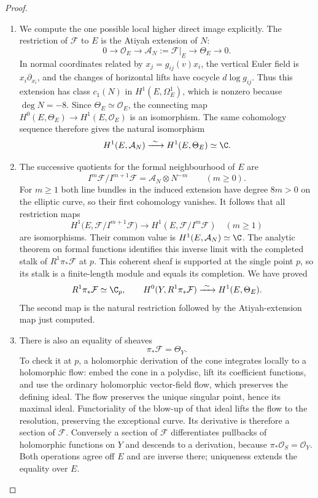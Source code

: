 \begin{proof}
\begin{enumerate}[label=\arabic*.,leftmargin=*]
\item We compute the one possible local higher direct image explicitly.
The restriction of $\mathcal F$ to $E$ is the Atiyah extension
of $N$:
\[
 0\longrightarrow\mathcal O_E
 \longrightarrow\mathcal A_N:=\mathcal F|_E
 \longrightarrow\Theta_E\longrightarrow0.
\]
In normal coordinates related by $x_j=g_{ij}(v)x_i$, the
vertical Euler field is $x_i\partial_{x_i}$, and the changes of
horizontal lifts have cocycle $d\log g_{ij}$.
Thus this extension has class $c_1(N)$ in
$H^1(E,\Omega^1_E)$, which is nonzero because $\deg N=-8$.
Since $\Theta_E\simeq\mathcal O_E$, the connecting map
$H^0(E,\Theta_E)\to H^1(E,\mathcal O_E)$ is an isomorphism.
The same cohomology sequence therefore gives the natural
isomorphism
\[
 H^1(E,\mathcal A_N)\xrightarrow{\ \sim\ }
 H^1(E,\Theta_E)\simeq\C.
\]

\item The successive quotients for the formal neighbourhood of $E$ are
\[
 I^m\mathcal F/I^{m+1}\mathcal F
     =\mathcal A_N\otimes N^{-m}\qquad(m\ge0).
\]
For $m\ge1$ both line bundles in the induced extension have
degree $8m>0$ on the elliptic curve, so their first cohomology
vanishes.  It follows that all restriction maps
\[
 H^1\bigl(E,\mathcal F/I^{m+1}\mathcal F\bigr)
 \longrightarrow H^1(E,\mathcal F/I^m\mathcal F)
 \quad(m\ge1)
\]
are isomorphisms.  Their common value is
$H^1(E,\mathcal A_N)\simeq\C$.
The analytic theorem on formal functions
\citep[Section~6, Hauptsatz~IIa, p.~59]{Grauert60}
identifies this inverse limit with the completed stalk of
$R^1\pi_*\mathcal F$ at $p$.
This coherent sheaf is supported at the single point $p$,
so its stalk is a finite-length module and equals its completion.
We have proved
\[
 R^1\pi_*\mathcal F\simeq\C_p,
 \qquad
 H^0(Y,R^1\pi_*\mathcal F)
    \xrightarrow{\ \sim\ }H^1(E,\Theta_E).
\]
The second map is the natural restriction followed by the
Atiyah-extension map just computed.

\item There is also an equality of sheaves
\[
 \pi_*\mathcal F=\Theta_Y.
\]
To check it at $p$, a holomorphic derivation of the cone
integrates locally to a holomorphic flow: embed the cone in a
polydisc, lift its coefficient functions, and use the ordinary
holomorphic vector-field flow, which preserves the defining ideal.
The flow preserves the unique singular point, hence its maximal
ideal.  Functoriality of the blow-up of that ideal lifts the flow
to the resolution, preserving the exceptional curve.
Its derivative is therefore a section of $\mathcal F$.
Conversely a section of $\mathcal F$ differentiates pullbacks
of holomorphic functions on $Y$ and descends to a derivation,
because $\pi_*\mathcal O_S=\mathcal O_Y$.
Both operations agree off $E$ and are inverse there; uniqueness
extends the equality over $E$.


\end{enumerate}
\end{proof}

